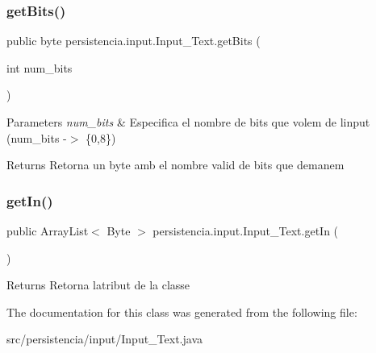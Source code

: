 \subsubsection{\texorpdfstring{get\+Bits()}{getBits()}}
{\footnotesize\ttfamily public byte persistencia.\+input.\+Input\+\_\+\+Text.\+get\+Bits (\begin{DoxyParamCaption}\item[{int}]{num\+\_\+bits }\end{DoxyParamCaption})\hspace{0.3cm}{\ttfamily [inline]}}


\begin{DoxyParams}{Parameters}
{\em num\+\_\+bits} & Especifica el nombre de bits que volem de l\textquotesingle{}input (num\+\_\+bits -\/$>$ \{0,8\}) \\
\hline
\end{DoxyParams}
\begin{DoxyReturn}{Returns}
Retorna un byte amb el nombre valid de bits que demanem 
\end{DoxyReturn}
\mbox{\label{classpersistencia_1_1input_1_1Input__Text_a36c0224f7ac8f3a60a80bacc571dd3be}} 
\subsubsection{\texorpdfstring{get\+In()}{getIn()}}
{\footnotesize\ttfamily public Array\+List$<$ Byte $>$ persistencia.\+input.\+Input\+\_\+\+Text.\+get\+In (\begin{DoxyParamCaption}{ }\end{DoxyParamCaption})\hspace{0.3cm}{\ttfamily [inline]}}

\begin{DoxyReturn}{Returns}
Retorna l\textquotesingle{}atribut de la classe 
\end{DoxyReturn}


The documentation for this class was generated from the following file\+:\begin{DoxyCompactItemize}
\item 
src/persistencia/input/Input\+\_\+\+Text.\+java\end{DoxyCompactItemize}
